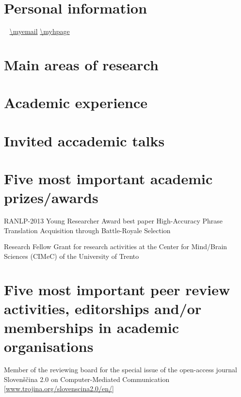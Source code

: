 \documentclass[10pt,a4paper]{moderncv}
\begin{document}
\section{Personal information}
{\large
{}           {\myfname~\mylname}
        {\myaddress \newline 
                         \myinstitute \newline
                         \myaddresss \newline 
                         \myaddressss}
      {\myphonefix}
    {\mynationality}
  {\mydob}
\cvitem{}{}
         {\url{\myemail}}
        {\url{\myhpage}}
}


\section{Main areas of research}
\cvitem{}{\myrinterests \newline \myrinterestss \newline \myrinterestsss}


\section{Academic experience}





\section{Invited accademic talks}

\section{Five most important academic prizes/awards}
        {RANLP-2013 Young Researcher Award}
        {best paper}
        {High-Accuracy Phrase Translation Acquisition through Battle-Royale Selection}{}

        {Research Fellow}
        {Grant for research activities at the Center for Mind/Brain Sciences
        (CIMeC) of the University of Trento}
        {}{}{}

\section{Five most important peer review activities, editorships and/or
         memberships in academic organisations}
        {Member of the reviewing board for the special issue of the open-access
         journal Slovenščina 2.0 on Computer-Mediated Communication}
        {}
        {[\href{http://www.trojina.org/slovenscina2.0/en/}{www.trojina.org/slovenscina2.0/en/}]}
        {} 
        {}
\end{document}
